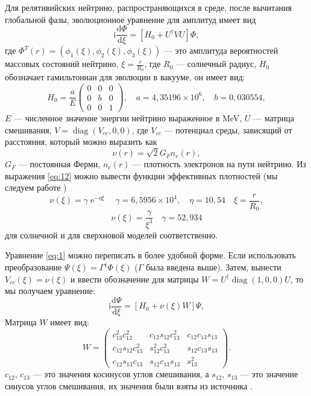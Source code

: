 \documentclass[a4paper,12pt]{article}
\newcommand{\dd}{\mathrm{d}}
\newcommand{\diag}{\operatorname{diag}}
\renewcommand{\exp}{\operatorname{e}}
\renewcommand{\imath}{\mathrm{i}}
\begin{document}
Для релятивийских нейтрино, распространяющихся в среде, после вычитания
глобальной фазы, эволюционное уравнение для амплитуд имеет вид
\begin{equation}\label{eq:1}
	\imath\frac{\dd\Phi}{\dd\xi}=[H_{0}+U^{\dagger}VU]\Phi,
\end{equation}
где \(\Phi^{T}(r)=(\phi_{1}(\xi),\phi_{2}(\xi),\phi_{3}(\xi))\) — это амплитуда
вероятностей массовых состояний нейтрино, \(\xi=\frac{r}{R_{0}}\), где \(R_{0}\) --- солнечный радиус, \(H_{0}\) обозначает гамильтониан для
эволюции в вакууме, он имеет вид:
\begin{equation}
	H_{0}=\frac{a}{E}
  \begin{pmatrix}
    0 & 0 & 0\\
    0 & b & 0\\
    0 & 0 & 1
  \end{pmatrix},
  \quad
  a=4,35196\times10^{6},
  \quad
  b=0,030554,
\end{equation}
\(E\) — численное значение энергии нейтрино выраженное в MeV, \(U\) — матрица
смешивания, \(V=\diag(V_{cc},0,0)\), где \(V_{cc}\) — потенциал среды, зависящий от расстояния, который можно выразить как
\begin{equation}\label{eq:12}
	\nu(r)=\sqrt{2}G_{F}n_{e}(r),
\end{equation}
\(G_{F}\) --- постоянная Ферми, \(n_{e}(r)\) --- плотность электронов на пути нейтрино. Из выражения \eqref{eq:12} можно вывести функции эффективных плотностей (мы следуем работе \cite{Casas:2016asi})
\begin{equation}\label{eq:10}
	\nu(\xi)=\gamma\exp^{-\eta\xi}
	\quad
	\gamma=6,5956\times10^{4},
	\quad
	\eta=10,54
	\quad 
	\xi=\frac{r}{R_{0}} ,
\end{equation}
\begin{equation}\label{eq:11}
	\nu(\xi)=\frac{\gamma}{\xi^{3}}
	\quad
	\gamma=52,934
\end{equation}
для солнечной и для сверхновой моделей соответственно.

Уравнение \eqref{eq:1} можно переписать в более удобной форме. Если использовать преобразование \(\Psi(\xi)=\Gamma^{\dag}\Phi(\xi)\) (\(\Gamma\) была введена
выше).  Затем, вынести \(V_{cc}(\xi)=\nu(\xi)\)  и ввести обозначение для матрицы \(W=U^{\dag}\diag(1,0,0)U\), то мы получаем
уравнение:
\begin{equation}\label{eq:9}
  \imath\frac{\dd\Psi}{\dd\xi}=[H_{0}+\nu(\xi)W]\Psi,
\end{equation}
Матрица \(W\) имеет вид:
\begin{equation}
  W=
  \begin{pmatrix}
    c_{13}^{2}c_{12}^{2} & c_{12}s_{12}c_{13}^{2} & c_{12}c_{13}s_{13}\\
    c_{12}s_{12}c_{13}^{2} & s_{12}^{2}c_{13}^{2} & s_{12}c_{13}s_{13}\\
    c_{12}s_{13}c_{13} & s_{12}c_{13}s_{13} & s_{13}^{2}
  \end{pmatrix}.
\end{equation}
\(c_{12}\), \(c_{13}\) — это значения косинусов углов смешивания, а \(s_{12}\),
\(s_{13}\) — это значение синусов углов смешивания, их значения были взяты из
источника \cite{Casas:2016asi}.
\end{document}
